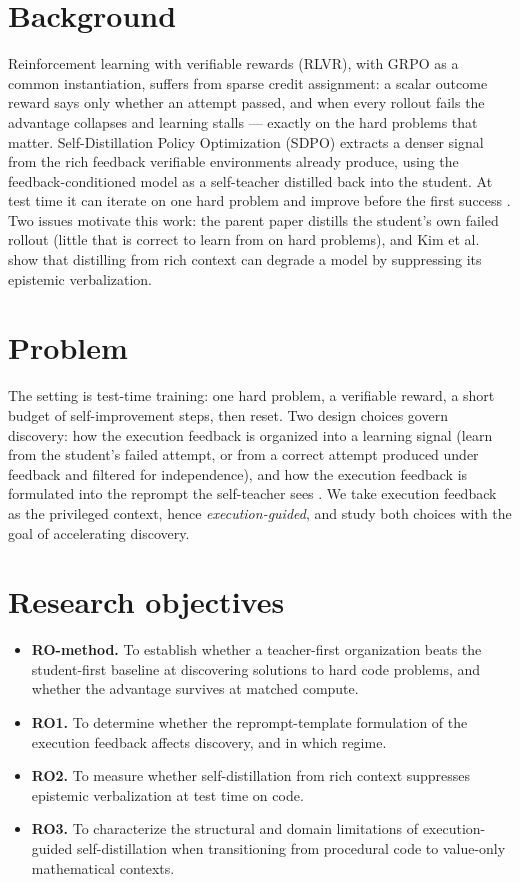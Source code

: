 \documentclass[12pt,a4paper]{report}
\providecommand{\tightlist}{\setlength{\itemsep}{0pt}\setlength{\parskip}{0pt}}
\begin{document}
\section{Background}\label{background}

Reinforcement learning with verifiable rewards (RLVR), with GRPO \cite{r8} as a common instantiation, suffers from sparse credit assignment: a scalar outcome reward says only whether an attempt passed, and when every rollout fails the advantage collapses and learning stalls --- exactly on the hard problems that matter. Self-Distillation Policy Optimization (SDPO) \cite{r1} extracts a denser signal from the rich feedback verifiable environments already produce, using the feedback-conditioned model as a self-teacher distilled back into the student. At test time it can iterate on one hard problem and improve before the first success \cite{r1}. Two issues motivate this work: the parent paper distills the student's own failed rollout (little that is correct to learn from on hard problems), and Kim et al.~\cite{r2} show that distilling from rich context can degrade a model by suppressing its epistemic verbalization.

\section{Problem}\label{problem}

The setting is test-time training: one hard problem, a verifiable reward, a short budget of self-improvement steps, then reset. Two design choices govern discovery: how the execution feedback is organized into a learning signal (learn from the student's failed attempt, or from a correct attempt produced under feedback and filtered for independence), and how the execution feedback is formulated into the reprompt the self-teacher sees \cite{r1}. We take execution feedback as the privileged context, hence \emph{execution-guided}, and study both choices with the goal of accelerating discovery.

\section{Research objectives}\label{research-questions}

\begin{itemize}
\tightlist
\item
  \textbf{RO-method.} To establish whether a teacher-first organization beats the student-first baseline at discovering solutions to hard code problems, and whether the advantage survives at matched compute.
\item
  \textbf{RO1.} To determine whether the reprompt-template formulation of the execution feedback affects discovery, and in which regime.
\item
  \textbf{RO2.} To measure whether self-distillation from rich context suppresses epistemic verbalization at test time on code.
\item
  \textbf{RO3.} To characterize the structural and domain limitations of execution-guided self-distillation when transitioning from procedural code to value-only mathematical contexts.
\end{itemize}
\end{document}

